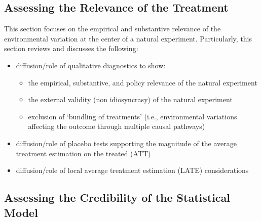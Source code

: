 \documentclass[nobib]{tufte-handout}
\begin{document}
\begin{refsection}
\subsection{Assessing the Relevance of the Treatment}
\label{sub:relevance}

\noindent This section focuses on the empirical and substantive relevance of the
environmental variation at the center of a natural experiment.  Particularly,
this section reviews and discusses the following:

\begin{itemize}
    \item diffusion/role of qualitative diagnostics to show:
        \begin{itemize}
            \item the empirical, substantive, and policy relevance of the
                natural experiment
            \item the external validity (non idiosyncrasy) of the natural
                experiment
            \item exclusion of `bundling of treatments' (i.e., environmental
                variations affecting the outcome through multiple causal
                pathways)
        \end{itemize}
    \item diffusion/role of placebo tests supporting the magnitude of the
        average treatment estimation on the treated  (ATT)
    \item diffusion/role of local average treatment estimation (LATE) 
        considerations
\end{itemize}

%
%
%
%
%
%
%
%
%
%
%

\subsection{Assessing the Credibility of the Statistical Model}
\label{sub:credibility}


\end{refsection}
\end{document}
